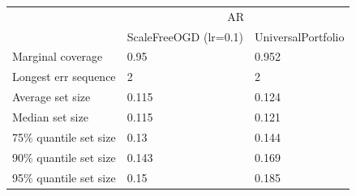 \begin{tabular}{lll}
\toprule
& \multicolumn{2}{c}{AR} \\
& ScaleFreeOGD (lr=0.1) & UniversalPortfolio \\
\midrule
Marginal coverage & 0.95 & 0.952 \\
Longest err sequence & 2 & 2 \\
Average set size & 0.115 & 0.124 \\
Median set size & 0.115 & 0.121 \\
75\% quantile set size & 0.13 & 0.144 \\
90\% quantile set size & 0.143 & 0.169 \\
95\% quantile set size & 0.15 & 0.185 \\
\bottomrule
\end{tabular}
